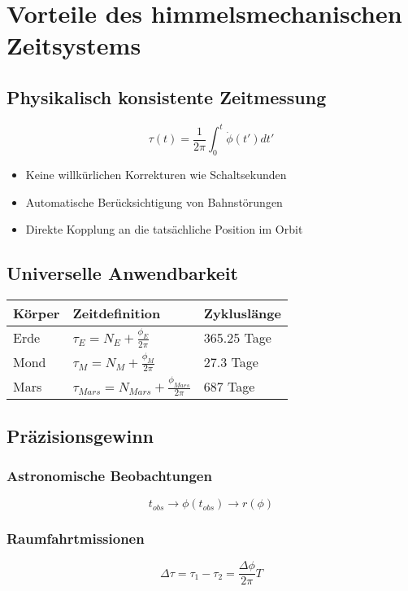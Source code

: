 \section{Vorteile des himmelsmechanischen Zeitsystems}

\subsection{Physikalisch konsistente Zeitmessung}
\begin{equation}
\tau(t) = \frac{1}{2\pi} \int_0^t \dot{\phi}(t') dt'
\end{equation}
\begin{itemize}
    \item Keine willkürlichen Korrekturen wie Schaltsekunden
    \item Automatische Berücksichtigung von Bahnstörungen
    \item Direkte Kopplung an die tatsächliche Position im Orbit
\end{itemize}

\subsection{Universelle Anwendbarkeit}
\begin{tabular}{lll}
    \hline
    Körper & Zeitdefinition & Zykluslänge \\
    \hline
    Erde & $\tau_E = N_E + \frac{\phi_E}{2\pi}$ & 365.25 Tage \\
    Mond & $\tau_M = N_M + \frac{\phi_M}{2\pi}$ & 27.3 Tage \\
    Mars & $\tau_{Mars} = N_{Mars} + \frac{\phi_{Mars}}{2\pi}$ & 687 Tage \\
    \hline
\end{tabular}

\subsection{Präzisionsgewinn}
\subsubsection{Astronomische Beobachtungen}
\begin{equation}
t_{obs} \rightarrow \phi(t_{obs}) \rightarrow r(\phi)
\end{equation}

\subsubsection{Raumfahrtmissionen}
\begin{equation}
\Delta\tau = \tau_1 - \tau_2 = \frac{\Delta\phi}{2\pi} T
\end{equation}

